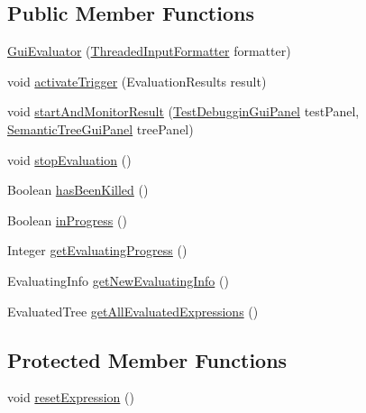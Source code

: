 \subsection*{Public Member Functions}
\begin{DoxyCompactItemize}
\item 
\hyperlink{classit_1_1emarolab_1_1cagg_1_1core_1_1evaluation_1_1GuiEvaluator_a1d12955d5430215a44ec86108e6699a3}{Gui\-Evaluator} (\hyperlink{classit_1_1emarolab_1_1cagg_1_1core_1_1evaluation_1_1inputFormatting_1_1ThreadedInputFormatter}{Threaded\-Input\-Formatter} formatter)
\item 
void \hyperlink{classit_1_1emarolab_1_1cagg_1_1core_1_1evaluation_1_1GuiEvaluator_acdc926a57208e75508ff6d5157b5452f}{activate\-Trigger} (Evaluation\-Results result)
\item 
void \hyperlink{classit_1_1emarolab_1_1cagg_1_1core_1_1evaluation_1_1GuiEvaluator_a162aa9204db7d2f115db59a607190990}{start\-And\-Monitor\-Result} (\hyperlink{classit_1_1emarolab_1_1cagg_1_1debugging_1_1baseComponents_1_1customPanel_1_1TestDebugginGuiPanel}{Test\-Debuggin\-Gui\-Panel} test\-Panel, \hyperlink{classit_1_1emarolab_1_1cagg_1_1debugging_1_1baseComponents_1_1customPanel_1_1SemanticTreeGuiPanel}{Semantic\-Tree\-Gui\-Panel} tree\-Panel)
\item 
void \hyperlink{classit_1_1emarolab_1_1cagg_1_1core_1_1evaluation_1_1GuiEvaluator_a14dd786e76f98ae69606f49b90aca892}{stop\-Evaluation} ()
\item 
Boolean \hyperlink{classit_1_1emarolab_1_1cagg_1_1core_1_1evaluation_1_1GuiEvaluator_a45966369f37071d8b57558c4dddada62}{has\-Been\-Killed} ()
\item 
Boolean \hyperlink{classit_1_1emarolab_1_1cagg_1_1core_1_1evaluation_1_1GuiEvaluator_aa2ac6b9c03006923243f0892b336c918}{in\-Progress} ()
\item 
Integer \hyperlink{classit_1_1emarolab_1_1cagg_1_1core_1_1evaluation_1_1GuiEvaluator_a68b051610cd066941b22d2c965e5f80a}{get\-Evaluating\-Progress} ()
\item 
Evaluating\-Info \hyperlink{classit_1_1emarolab_1_1cagg_1_1core_1_1evaluation_1_1GuiEvaluator_a6c612f25937d135fd60533bfcd695696}{get\-New\-Evaluating\-Info} ()
\item 
Evaluated\-Tree \hyperlink{classit_1_1emarolab_1_1cagg_1_1core_1_1evaluation_1_1GuiEvaluator_ae6680fc2706f767fb69aa99b542a8f77}{get\-All\-Evaluated\-Expressions} ()
\end{DoxyCompactItemize}
\subsection*{Protected Member Functions}
\begin{DoxyCompactItemize}
\item 
void \hyperlink{classit_1_1emarolab_1_1cagg_1_1core_1_1evaluation_1_1GuiEvaluator_a3f67f7d0cbf1c4acb7b0ecc9128743bf}{reset\-Expression} ()
\end{DoxyCompactItemize}
